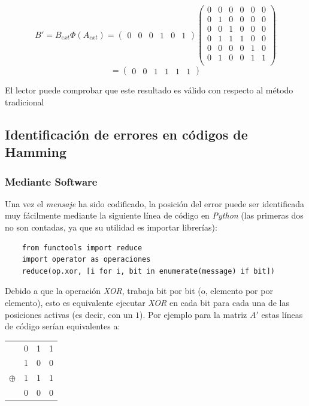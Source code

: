 \documentclass{article}
\begin{document}
$$
B' = B_{ext} \Phi(A_{ext}) = \begin{pmatrix}
    0 & 0 & 0 & 1 & 0 & 1
\end{pmatrix}
\begin{pmatrix}
    0 & 0 & 0 & 0 & 0 & 0 \\
    0 & 1 & 0 & 0 & 0 & 0 \\
    0 & 0 & 1 & 0 & 0 & 0 \\
    0 & 1 & 1 & 1 & 0 & 0 \\
    0 & 0 & 0 & 0 & 1 & 0 \\
    0 & 1 & 0 & 0 & 1 & 1 \\
\end{pmatrix}
$$$$
= \begin{pmatrix}
    0 & 0 & 1 & 1 & 1 & 1
\end{pmatrix}
$$

El lector puede comprobar que este resultado es válido con respecto al método tradicional

\subsection{Identificación de errores en códigos de Hamming}

\subsubsection{Mediante Software}

Una vez el \textit{mensaje} ha sido codificado, la posición del error puede ser identificada muy fácilmente mediante la siguiente línea de código en \textit{Python} (las primeras dos no son contadas, ya que su utilidad es importar librerías):

\begin{verbatim}
    from functools import reduce
    import operator as operaciones
    reduce(op.xor, [i for i, bit in enumerate(message) if bit])
\end{verbatim}

Debido a que la operación \textit{XOR}, trabaja bit por bit (o, elemento por por elemento), esto es equivalente ejecutar \textit{XOR} en cada bit para cada una de las posiciones activas (es decir, con un $1$). Por ejemplo para la matriz $A'$ estas líneas de código serían equivalentes a:

\begin{center}
\begin{tabular}{c c c c}
    & 0 & 1 & 1 \\
    & 1 & 0 & 0 \\
    $\oplus$ & 1 & 1 & 1 \\
    \hline
    & 0 & 0 & 0
\end{tabular}
\end{center}
\end{document}
